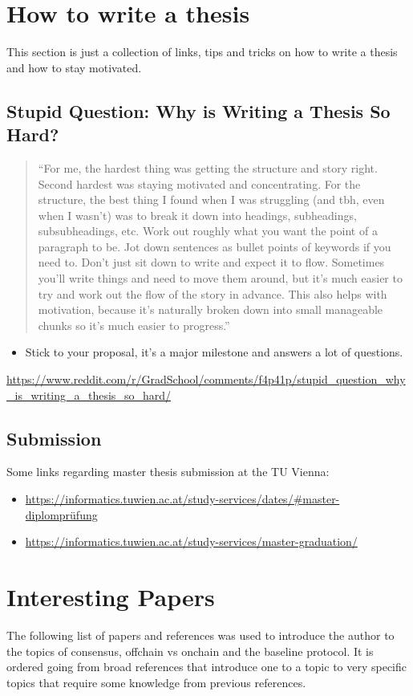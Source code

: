 \section{How to write a thesis}
This section is just a collection of links, tips and tricks on how to write a thesis and how to stay motivated.

\subsection{Stupid Question: Why is Writing a Thesis So Hard?}
\begin{quote}
    ``For me, the hardest thing was getting the structure and story right. Second hardest was staying motivated and concentrating. For the structure, the best thing I found when I was struggling (and tbh, even when I wasn't) was to break it down into headings, subheadings, subsubheadings, etc. Work out roughly what you want the point of a paragraph to be. Jot down sentences as bullet points of keywords if you need to. Don't just sit down to write and expect it to flow. Sometimes you'll write things and need to move them around, but it's much easier to try and work out the flow of the story in advance. This also helps with motivation, because it's naturally broken down into small manageable chunks so it's much easier to progress.''
\end{quote}

\begin{itemize}
    \item Stick to your proposal, it's a major milestone and answers a lot of questions.
\end{itemize}

\url{https://www.reddit.com/r/GradSchool/comments/f4p41p/stupid_question_why_is_writing_a_thesis_so_hard/}

\subsection{Submission}
Some links regarding master thesis submission at the TU Vienna:

\begin{itemize}
    \item \url{https://informatics.tuwien.ac.at/study-services/dates/#master-diplomprüfung}
    \item \url{https://informatics.tuwien.ac.at/study-services/master-graduation/}
\end{itemize}

\section{Interesting Papers}
The following list of papers and references was used to introduce the author to the topics of consensus, offchain vs onchain and the baseline protocol. It is ordered going from broad references that introduce one to a topic to very specific topics that require some knowledge from previous references.

